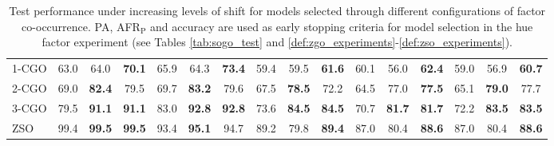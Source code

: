 \begin{table}[H]
{\begin{tabular}{l|ccc|ccc|ccc|ccc|ccc}
    1-CGO & 63.0 & 64.0 & {\textbf{70.1}} & 65.9 & 64.3 & {\textbf{73.4}} & 59.4 & 59.5 & {\textbf{61.6}} & 60.1 & 56.0 & {\textbf{62.4}} & 59.0 & 56.9 & {\textbf{60.7}} \\
    2-CGO & 69.0 & {\textbf{82.4}} & 79.5 & 69.7 & {\textbf{83.2}} & 79.6 & 67.5 & {\textbf{78.5}} & 72.2 & 64.5 & 77.0 & {\textbf{77.5}} & 65.1 & {\textbf{79.0}} & 77.7 \\
    3-CGO & 79.5 & \textbf{91.1} & {\textbf{91.1}} & 83.0 & \textbf{92.8} & {\textbf{92.8}} & 73.6 & \textbf{84.5} & {\textbf{84.5}} & 70.7 & \textbf{81.7} & {\textbf{81.7}} & 72.2 & \textbf{83.5} & {\textbf{83.5}} \\
    ZSO & 99.4 & \textbf{99.5} & {\textbf{99.5}} & 93.4 & {\textbf{95.1}} & 94.7 & 89.2 & 79.8 & {\textbf{89.4}} & 87.0 & 80.4 & {\textbf{88.6}} & 87.0 & 80.4 & {\textbf{88.6}} \\
    \bottomrule
    \end{tabular}%
    }
    \caption{
        Test performance under increasing levels of shift for models selected through different configurations of factor
        co-occurrence. PA, AFR$_{\text{P}}$ and accuracy are used as early stopping criteria for model selection
        in the hue factor experiment (see Tables \ref{tab:sogo_test} and \ref{def:zgo_experiments}-\ref{def:zso_experiments}).
    }
    \label{tab:sogo_hue_full}
\end{table}

